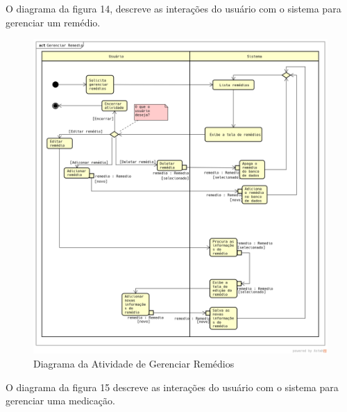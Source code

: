 \documentclass[12pt]{article}
\begin{document}
O diagrama da figura 14, descreve as interações do usuário com o sistema para gerenciar um remédio.
\begin{figure}[!h]
	\begin{center}
		\caption{Diagrama da Atividade de Gerenciar Remédios}
		\includegraphics[width=6in]{img/atividaderemedio.png}

	\end{center}
\end{figure}

\newpage

O diagrama da figura 15 descreve as interações do usuário com o sistema para gerenciar uma medicação.
\end{document}
